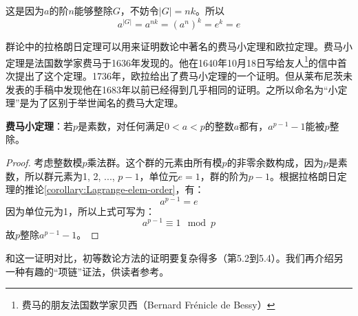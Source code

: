 \documentclass[b5paper]{ctexart}
\begin{document}
这是因为$a$的阶$n$能够整除$G$，不妨令$|G| = nk$。所以
\[
a^{|G|} = a^{nk} = (a^n)^k = e^k = e
\]

群论中的拉格朗日定理可以用来证明数论中著名的费马小定理和欧拉定理。费马小定理是法国数学家费马于1636年发现的。他在1640年10月18日写给友人\footnote{费马的朋友法国数学家贝西（Bernard Frénicle de Bessy）}的信中首次提出了这个定理。1736年，欧拉给出了费马小定理的一个证明。但从莱布尼茨未发表的手稿中发现他在1683年以前已经得到几乎相同的证明。之所以命名为“小定理”是为了区别于举世闻名的费马大定理。

\begin{theorem}
\textbf{费马小定理}：若$p$是素数，对任何满足$0 < a < p$的整数$a$都有，$a^{p-1}-1$能被$p$整除。
\end{theorem}

\begin{proof}
考虑整数模$p$乘法群。这个群的元素由所有模$p$的非零余数构成，因为$p$是素数，所以群元素为1, 2, ..., $p-1$，单位元$e = 1$，群的阶为$p-1$。根据拉格朗日定理的推论\ref{corollary:Lagrange-elem-order}，有：
\[
a^{p-1} = e
\]
因为单位元为1，所以上式可写为：
\[
a^{p-1} \equiv 1 \mod p
\]
故$p$整除$a^{p-1} - 1$。
\end{proof}

和这一证明对比，初等数论方法的证明要复杂得多（\cite{StepanovRose15}第5.2到5.4）。我们再介绍另一种有趣的“项链”证法\cite{Wiki-FLT-proof}，供读者参考。
\end{document}
